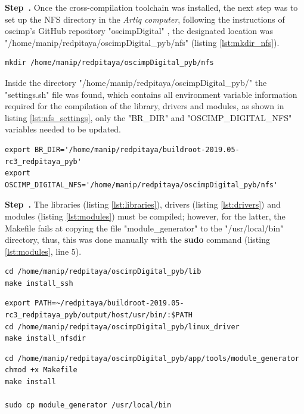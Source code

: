 \documentclass[a4paper,12pt]{article}
\newcounter{step}
\newenvironment{step}[1][]{\refstepcounter{step}\par\medskip
	\textbf{Step~\thestep. #1} \rmfamily }{\medskip}
\begin{document}
\begin{step}
Once the cross-compilation toolchain was installed, the next step was to set up the NFS directory in the \textit{Artiq computer}, following the instructions of oscimp's GitHub repository "oscimpDigital" \cite{oscimp}, the designated location was "/home/manip/redpitaya/oscimpDigital\_pyb/nfs" (listing \ref{lst:mkdir_nfs}).

\begin{lstlisting}[style=bash,label={lst:mkdir_nfs},caption={Creating NFS directory.}]
mkdir /home/manip/redpitaya/oscimpDigital_pyb/nfs
\end{lstlisting}

Inside the directory "/home/manip/redpitaya/oscimpDigital\_pyb/" the "settings.sh" file was found, which contains all environment variable information required for the compilation of the library, drivers and modules, as shown in listing \ref{lst:nfs_settings}, only the "BR\_DIR" and "OSCIMP\_DIGITAL\_NFS" variables needed to be updated.

\begin{lstlisting}[style=bash,label={lst:nfs_settings},caption={Updating variables "settings.sh" file.}]
export BR_DIR='/home/manip/redpitaya/buildroot-2019.05-rc3_redpitaya_pyb'
export OSCIMP_DIGITAL_NFS='/home/manip/redpitaya/oscimpDigital_pyb/nfs'
\end{lstlisting}

\end{step}

\begin{step}
The libraries (listing \ref{lst:libraries}), drivers (listing \ref{lst:drivers}) and modules (listing \ref{lst:modules}) must be compiled; however, for the latter, the Makefile fails at copying the file "module\_generator" to the "/usr/local/bin" directory, thus, this was done manually with the \textbf{sudo} command (listing \ref{lst:modules}, line 5).

\begin{lstlisting}[style=bash,label={lst:libraries},caption={Compiling the libraries.}]
cd /home/manip/redpitaya/oscimpDigital_pyb/lib
make install_ssh
\end{lstlisting}

\begin{lstlisting}[style=bash,label={lst:drivers},caption={Installing the drivers.}]
export PATH=~/redpitaya/buildroot-2019.05-rc3_redpitaya_pyb/output/host/usr/bin/:$PATH
cd /home/manip/redpitaya/oscimpDigital_pyb/linux_driver
make install_nfsdir
\end{lstlisting}

\begin{lstlisting}[style=bash,label={lst:modules},caption={Compiling the module generator tool.}]
cd /home/manip/redpitaya/oscimpDigital_pyb/app/tools/module_generator
chmod +x Makefile
make install

sudo cp module_generator /usr/local/bin
\end{lstlisting}

\end{step}
\end{document}
